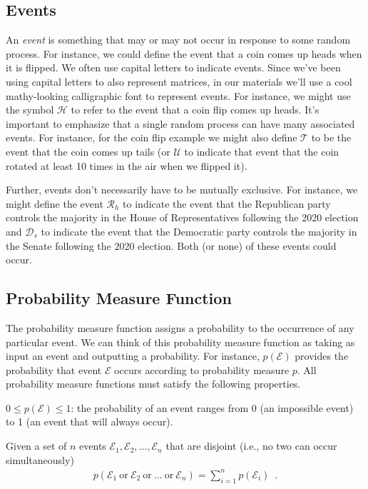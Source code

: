 \documentclass[assignment01_Solutions]{subfiles}
\begin{document}
\subsection{Events}

An \emph{event} is something that may or may not occur in response to some random process.  For instance, we could define the event that a coin comes up heads when it is flipped.  We often use capital letters to indicate events.  Since we've been using capital letters to also represent matrices, in our materials we'll use a cool mathy-looking calligraphic font to represent events.  For instance, we might use the symbol $\mathcal{H}$ to refer to the event that a coin flip comes up heads. It's important to emphasize that a single random process can have many associated events.   For instance, for the coin flip example we might also define $\mathcal{T}$ to be the event that the coin comes up tails (or $\mathcal{U}$ to indicate that event that the coin rotated at least 10 times in the air when we flipped it).

Further, events don't necessarily have to be mutually exclusive.  For instance, we might define the event $\mathcal{R}_h$ to indicate the event that the Republican party controls the majority in the House of Representatives following the 2020 election and $\mathcal{D}_s$ to indicate the event that the Democratic party controls the majority in the Senate following the 2020 election.  Both (or none) of these events could occur.

\subsection{Probability Measure Function}
The probability measure function assigns a probability to the occurrence of any particular event.  We can think of this probability measure function as taking as input an event and outputting a probability.  For instance, $p(\mathcal{E})$ provides the probability that event $\mathcal{E}$ occurs according to probability measure $p$.  All probability measure functions must satisfy the following properties.

\bi
\item $0 \leq p(\mathcal{E}) \leq 1$: the probability of an event ranges from 0 (an impossible event) to 1 (an event that will always occur).
\item Given a set of $n$ events $\mathcal{E}_1, \mathcal{E}_2, \ldots, \mathcal{E}_n$ that are disjoint (i.e., no two can occur simultaneously)
\begin{align}
p(\mathcal{E}_1~\mbox{or}~\mathcal{E}_2~\mbox{or}~\ldots~\mbox{or}~\mathcal{E}_n) = \sum_{i=1}^n p(\mathcal{E}_i) \label{eq:probunion} \enspace .
\end{align}
\end{document}
